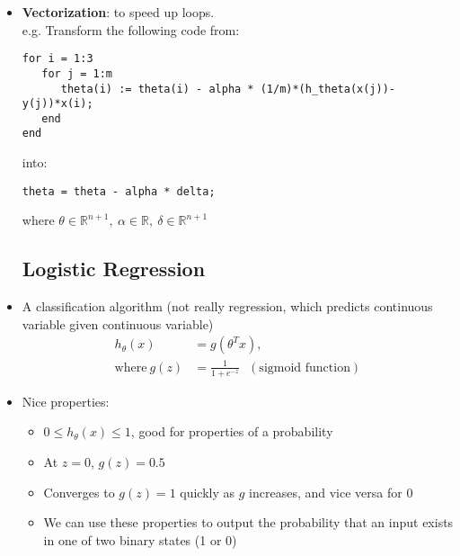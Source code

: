 \documentclass[titlepage]{article}
\begin{document}
\begin{itemize}
\item \textbf{Vectorization}: to speed up loops.\\
e.g. Transform the following code from: 

\begin{Verbatim}[obeytabs]
for i = 1:3
   for j = 1:m
      theta(i) := theta(i) - alpha * (1/m)*(h_theta(x(j))-y(j))*x(i);
   end
end
\end{Verbatim}


into:
\begin{verbatim}
theta = theta - alpha * delta;
\end{verbatim}

where $\theta \in \mathbb{R}^{n+1},\ \alpha \in \mathbb{R},\ \delta \in \mathbb{R}^{n+1}$

\subsection{Logistic Regression}
\item A classification algorithm (not really regression, which predicts continuous variable given continuous variable)
\begin{align*}
h_\theta (x) &= g(\theta^Tx), \\
\text{where} \ g(z) &= \frac{1}{1+e^{-z}} \ \ \ (\text{sigmoid function})
\end{align*}

\begin{center}
\end{center}

\item Nice properties:
\begin{itemize} [label = $\bullet$]
	\item {$0 \leq h_\theta (x) \leq 1$}, good for properties of a probability
	\item At $z=0$, $g(z) = 0.5$
	\item Converges to $g(z) =1$ quickly as $g$ increases, and vice versa for 0
	\item We can use these properties to output the probability that an input exists in one of two binary states (1 or 0)
\end{itemize}



\end{itemize}
\end{document}
